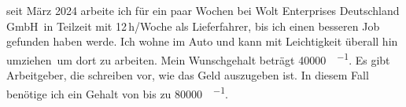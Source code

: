 		seit März 2024 arbeite ich für ein paar Wochen bei \glqq Wolt Enterprises Deutschland GmbH\grqq\ in Teilzeit mit 12\,h/Woche als Lieferfahrer, bis ich einen besseren Job gefunden haben werde.
		Ich wohne im Auto und kann mit Leichtigkeit überall hin \glqq umziehen\grqq\, um dort zu arbeiten.
		Mein Wunschgehalt beträgt \SI{40000}{\sieuro\per\year}.
		Es gibt Arbeitgeber, die schreiben vor, wie das Geld auszugeben ist.
		In diesem Fall benötige ich ein Gehalt von bis zu \SI{80000}{\sieuro\per\year}.